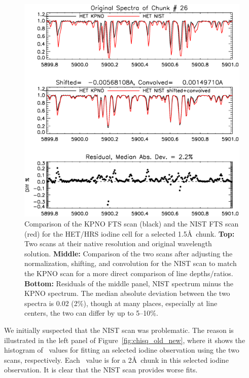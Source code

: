     
\begin{figure}[!th]
\centering
\includegraphics[angle=0.,scale=0.45]{het/compare_het_fts_26.eps}
\caption{Comparison of the KPNO FTS scan (black) and the NIST FTS scan
  (red) for the HET/HRS iodine cell for a selected
  1.5\AA\ chunk. \textbf{Top:} Two scans at their native resolution
  and original wavelength solution. \textbf{Middle:} Comparison of the
  two scans after adjusting the normalization, shifting, and
  convolution for the NIST scan to match the KPNO scan for a more
  direct comparison of line depths/ratios. \textbf{Bottom:} Residuals
  of the middle panel, NIST spectrum minus the KPNO spectrum. The
  median absolute deviation between the two spectra is 0.02
  (2\%), though at many places, especially at line centers, the two
  can differ by up to 5--10\%.
  \label{fig:fts_old_new}}
\end{figure}

We initially suspected that the NIST scan was problematic. The reason is
illustrated in the left panel of Figure~\ref{fig:chisq_old_new}, where
it shows the histogram of \chisq\ values for fitting an selected iodine
observation using the two scans, respectively. Each \chisq\ value is
for a 2\AA\ chunk in this selected iodine observation. It is clear
that the NIST scan provides worse fits.

